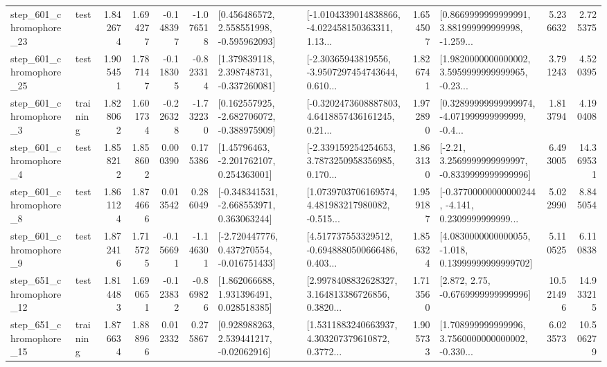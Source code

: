 \begin{tabular}{llrrrrllrlrr}
  step\_601\_chromophore\_23 &      test &      1.842674 &    1.694277 &     -0.148397 & -1.076518 &    [0.456486572, 2.558551998, -0.595962093] &  [-1.0104339014838866, -4.022458150363311, 1.13... &       1.654507 &  [0.8669999999999991, 3.881999999999998, -1.259... &            5.236632 &          2.725375 \\
  step\_601\_chromophore\_25 &      test &      1.905451 &    1.787147 &     -0.118305 & -0.823314 &    [1.379839118, 2.398748731, -0.337260081] &  [-2.30365943819556, -3.9507297454743644, 0.610... &       1.826741 &  [1.9820000000000002, 3.5959999999999965, -0.23... &            3.791243 &          4.520395 \\
   step\_601\_chromophore\_3 &  training &      1.828062 &    1.601734 &     -0.226328 & -1.732230 &   [0.162557925, -2.682706072, -0.388975909] &  [-0.3202473608887803, 4.6418857436161245, 0.21... &       1.972890 &  [0.32899999999999974, -4.071999999999999, -0.4... &            1.813794 &          4.190408 \\
   step\_601\_chromophore\_4 &      test &      1.858212 &    1.858602 &      0.000390 &  0.175386 &     [1.45796463, -2.201762107, 0.254363001] &  [-2.339159254254653, 3.7873250958356985, 0.170... &       1.863130 &   [-2.21, 3.2569999999999997, -0.8339999999999996] &            6.493005 &         14.369531 \\
   step\_601\_chromophore\_8 &      test &      1.861124 &    1.874666 &      0.013542 &  0.286049 &   [-0.348341531, -2.668553971, 0.363063244] &  [1.0739703706169574, 4.481983217980082, -0.515... &       1.959187 &  [-0.37700000000000244, -4.141, 0.2309999999999... &            5.022990 &          8.845054 \\
   step\_601\_chromophore\_9 &      test &      1.872416 &    1.715725 &     -0.156691 & -1.146301 &   [-2.720447776, 0.437270554, -0.016751433] &  [4.517737553329512, -0.6948880500666486, 0.403... &       1.856324 &  [4.0830000000000055, -1.018, 0.13999999999999702] &            5.110525 &          6.110838 \\
  step\_651\_chromophore\_12 &      test &      1.814483 &    1.690651 &     -0.123832 & -0.869826 &     [1.862066688, 1.931396491, 0.028518385] &  [2.9978408832628327, 3.164813386726856, 0.3820... &       1.713560 &                 [2.872, 2.75, -0.6769999999999996] &           10.521496 &         14.933215 \\
  step\_651\_chromophore\_15 &  training &      1.876634 &    1.888966 &      0.012332 &  0.275867 &     [0.928988263, 2.539441217, -0.02062916] &  [1.5311883240663937, 4.303207379610872, 0.3772... &       1.905733 &  [1.708999999999996, 3.7560000000000002, -0.330... &            6.023573 &         10.506279 \\

\end{tabular}
